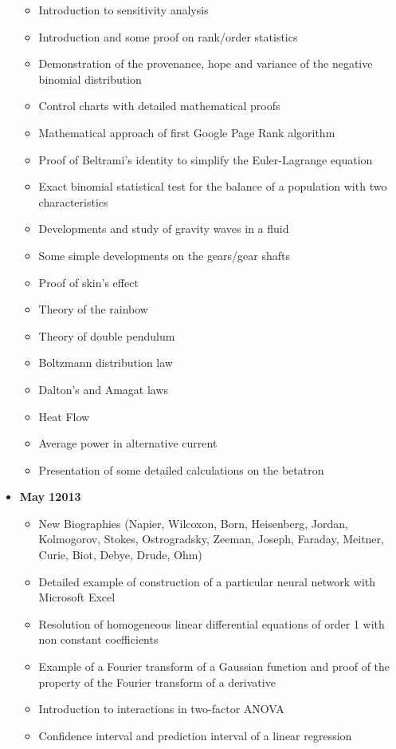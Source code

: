 \begin{itemize}
\begin{itemize}[noitemsep]
			\item Introduction to sensitivity analysis
			\item Introduction and some proof on rank/order statistics
			\item Demonstration of the provenance, hope and variance of the negative binomial distribution
			\item Control charts with detailed mathematical proofs
			\item Mathematical approach of first Google Page Rank algorithm
			\item Proof of Beltrami's identity to simplify the Euler-Lagrange equation
			\item Exact binomial statistical test for the balance of a population with two characteristics
			\item Developments and study of gravity waves in a fluid
			\item Some simple developments on the gears/gear shafts
			\item Proof of skin's effect
			\item Theory of the rainbow
			\item Theory of double pendulum
			\item Boltzmann distribution law
			\item Dalton's and Amagat laws
			\item Heat Flow
			\item Average power in alternative current
			\item Presentation of some detailed calculations on the betatron
		\end{itemize}
	\item \textbf{May 12013}
		\begin{itemize}[noitemsep]
			\item New Biographies (Napier, Wilcoxon, Born, Heisenberg, Jordan, Kolmogorov, Stokes, Ostrogradsky, Zeeman, Joseph, Faraday, Meitner, Curie, Biot, Debye, Drude, Ohm)
			\item Detailed example of construction of a particular neural network with Microsoft Excel
			\item Resolution of homogeneous linear differential equations of order 1 with non constant coefficients
			\item Example of a Fourier transform of a Gaussian function and proof of the property of the Fourier transform of a derivative
			\item Introduction to interactions in two-factor ANOVA
			\item Confidence interval and prediction interval of a linear regression

\end{itemize}
\end{itemize}
